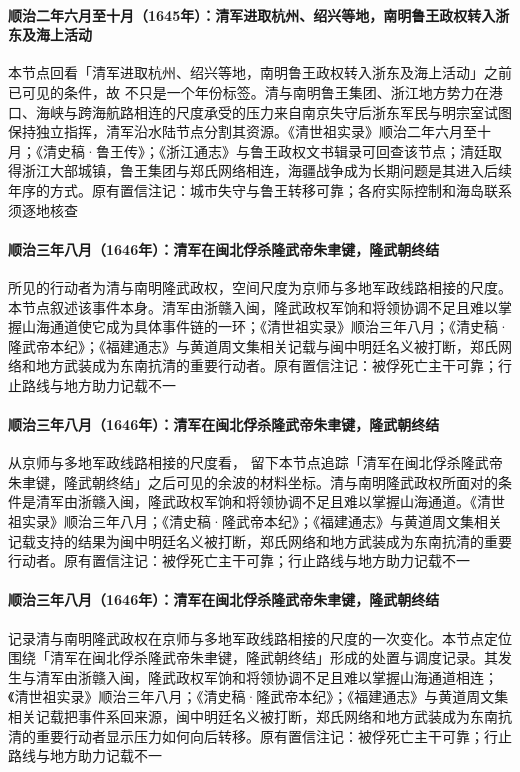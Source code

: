 \paragraph{顺治二年六月至十月（1645年）：清军进取杭州、绍兴等地，南明鲁王政权转入浙东及海上活动}
本节点回看「清军进取杭州、绍兴等地，南明鲁王政权转入浙东及海上活动」之前已可见的条件，故 不只是一个年份标签。清与南明鲁王集团、浙江地方势力在港口、海峡与跨海航路相连的尺度承受的压力来自南京失守后浙东军民与明宗室试图保持独立指挥，清军沿水陆节点分割其资源。《清世祖实录》顺治二年六月至十月；《清史稿·鲁王传》；《浙江通志》与鲁王政权文书辑录可回查该节点；清廷取得浙江大部城镇，鲁王集团与郑氏网络相连，海疆战争成为长期问题是其进入后续年序的方式。原有置信注记：城市失守与鲁王转移可靠；各府实际控制和海岛联系须逐地核查

\paragraph{顺治三年八月（1646年）：清军在闽北俘杀隆武帝朱聿键，隆武朝终结}
 所见的行动者为清与南明隆武政权，空间尺度为京师与多地军政线路相接的尺度。本节点叙述该事件本身。清军由浙赣入闽，隆武政权军饷和将领协调不足且难以掌握山海通道使它成为具体事件链的一环；《清世祖实录》顺治三年八月；《清史稿·隆武帝本纪》；《福建通志》与黄道周文集相关记载与闽中明廷名义被打断，郑氏网络和地方武装成为东南抗清的重要行动者。原有置信注记：被俘死亡主干可靠；行止路线与地方助力记载不一

\paragraph{顺治三年八月（1646年）：清军在闽北俘杀隆武帝朱聿键，隆武朝终结}
从京师与多地军政线路相接的尺度看， 留下本节点追踪「清军在闽北俘杀隆武帝朱聿键，隆武朝终结」之后可见的余波的材料坐标。清与南明隆武政权所面对的条件是清军由浙赣入闽，隆武政权军饷和将领协调不足且难以掌握山海通道。《清世祖实录》顺治三年八月；《清史稿·隆武帝本纪》；《福建通志》与黄道周文集相关记载支持的结果为闽中明廷名义被打断，郑氏网络和地方武装成为东南抗清的重要行动者。原有置信注记：被俘死亡主干可靠；行止路线与地方助力记载不一

\paragraph{顺治三年八月（1646年）：清军在闽北俘杀隆武帝朱聿键，隆武朝终结}
 记录清与南明隆武政权在京师与多地军政线路相接的尺度的一次变化。本节点定位围绕「清军在闽北俘杀隆武帝朱聿键，隆武朝终结」形成的处置与调度记录。其发生与清军由浙赣入闽，隆武政权军饷和将领协调不足且难以掌握山海通道相连；《清世祖实录》顺治三年八月；《清史稿·隆武帝本纪》；《福建通志》与黄道周文集相关记载把事件系回来源，闽中明廷名义被打断，郑氏网络和地方武装成为东南抗清的重要行动者显示压力如何向后转移。原有置信注记：被俘死亡主干可靠；行止路线与地方助力记载不一

